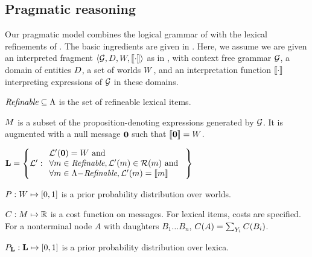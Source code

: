 \documentclass[leqno]{article}
\begin{document}

\subsection{Pragmatic reasoning}\label{sec:agents}

Our pragmatic model combines the logical grammar of
 with the lexical refinements of
. The basic ingredients are given in
. Here, we assume we are given an interpreted fragment
$\langle \mathcal{G}, D, W, \llbracket\cdot\rrbracket \rangle$ as in
, with context free grammar $\mathcal{G}$, a domain
of entities $D$, a set of worlds $W$, and an
interpretation function $\llbracket\cdot\rrbracket$ interpreting expressions of
$\mathcal{G}$ in these domains.
%
\begin{examples}
\item\label{modobjects}
  \begin{examples}
  \item\label{refineable} $\textit{Refinable} \subseteq \Lambda$ is the set of
    refineable lexical items.

  \item\label{messages} $M$ is a subset of the
    proposition-denoting expressions generated by $\mathcal{G}$. It is
    augmented with a null message $\mathbf{0}$ such that $\llbracket\mathbf{0}\rrbracket
    = W$.

  \item\label{lexset}%
    $\mathbf{L} = \left\{ \mathcal{L}' :       
      \begin{array}[c]{l}
        \mathcal{L}'(\mathbf{0}) = W \text{ and } \\ 
        \forall m \in \textit{Refinable}, \mathcal{L}'(m) \in \mathcal{R}(m) \text{ and } \\
        \forall m \in \Lambda{-}\textit{Refinable}, \mathcal{L}'(m) = \llbracket m\rrbracket
      \end{array} \right\}$
  
  \item $P : W \mapsto [0,1]$ is a prior probability
    distribution over worlds.

  \item $C : M \mapsto \mathbb{R}$ is a cost function on
    messages.  For lexical items, costs are specified. For a
    nonterminal node $A$ with daughters $B_{1} \ldots B_{n}$,
    $C(A) = \sum_{Y_{i}}C(B_{i})$.

  \item $P_{\mathbf{L}} : \mathbf{L} \mapsto [0,1]$ is a prior probability
    distribution over lexica.
  \end{examples}
\end{examples}
\end{document}
